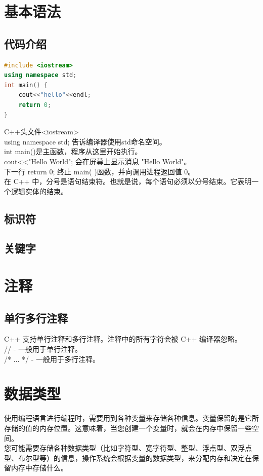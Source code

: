 \documentclass[12pt,twiside,a4paper]{ctexbook}
\numberwithin{chapter}{part}
\begin{document}
\chapter{基本语法}
\section{代码介绍}
\begin{lstlisting}[language=C++]
#include <iostream>
using namespace std;
int main() {
	cout<<"hello"<<endl;
	return 0;
}
\end{lstlisting}
C++头文件<iostream>\\
using namespace std; 告诉编译器使用std命名空间。\\
int main()是主函数，程序从这里开始执行。\\
cout<<"Hello World"; 会在屏幕上显示消息 "Hello World"。\\
下一行 return 0; 终止 main( )函数，并向调用进程返回值 0。\\
在 C++ 中，分号是语句结束符。也就是说，每个语句必须以分号结束。它表明一个逻辑实体的结束。

\section{标识符}

\section{关键字}

\chapter{注释}
\section{单行多行注释}
C++ 支持单行注释和多行注释。注释中的所有字符会被 C++ 编译器忽略。\\
// - 一般用于单行注释。\\
/* ... */ - 一般用于多行注释。

\chapter{数据类型}
使用编程语言进行编程时，需要用到各种变量来存储各种信息。变量保留的是它所存储的值的内存位置。这意味着，当您创建一个变量时，就会在内存中保留一些空间。\\
您可能需要存储各种数据类型（比如字符型、宽字符型、整型、浮点型、双浮点型、布尔型等）的信息，操作系统会根据变量的数据类型，来分配内存和决定在保留内存中存储什么。
\end{document}
